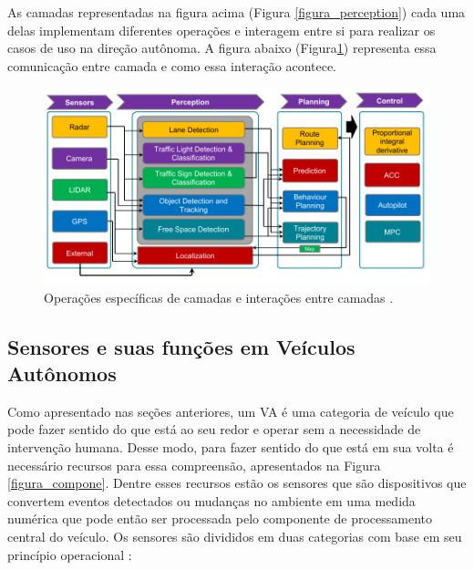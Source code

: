 As camadas representadas na figura acima (Figura \ref{figura_perception}) cada uma delas implementam diferentes operações e interagem entre si para realizar os casos de uso na direção autônoma. A figura abaixo (Figura\ref{figura_camadas}) representa essa comunicação entre camada e como essa interação acontece.

\begin{figure}[H]
\centering
\includegraphics[width=\textwidth]{Figures/layer-sens.png}
\caption{Operações específicas de camadas e interações entre camadas \cite{sensors-yet}.}
\label{figura_camadas}
\end{figure}



\subsection{Sensores e suas funções em Veículos Autônomos} \label{sensores-a}

Como apresentado nas seções anteriores, um VA é uma categoria de veículo que pode fazer sentido do que está ao seu redor e operar sem a necessidade de intervenção humana. Desse modo, para fazer sentido do que está em sua volta é necessário recursos para essa compreensão, apresentados na Figura \ref{figura_compone}. Dentre esses recursos estão os sensores que são dispositivos que convertem eventos detectados ou mudanças no ambiente em uma medida numérica que pode então ser processada pelo componente de processamento central do veículo. 
Os sensores são divididos em duas categorias com base em seu princípio operacional \cite{sensors}: 

